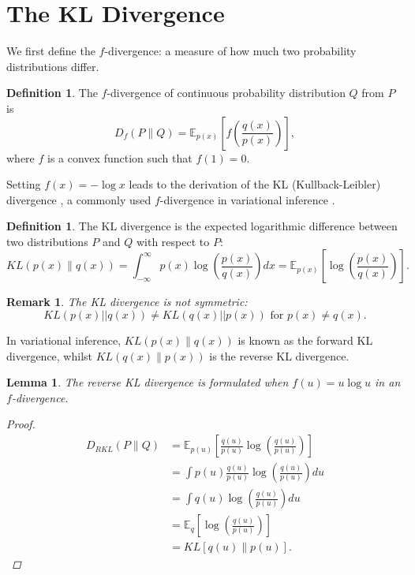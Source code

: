 \documentclass[honours,12pt]{unswthesis}
\newtheorem{lemma}[theorem]{Lemma}
\newtheorem{remark}[theorem]{Remark}
\numberwithin{equation}{section}
\theoremstyle{definition}
\newtheorem{definition}[theorem]{Definition}
\begin{document}
\section{The KL Divergence}\label{sec:3.2}
We first define the $f$-divergence: a measure of how much two probability distributions differ.
\begin{definition}\label{def:3.2.1}
The $f$-divergence of continuous probability distribution $Q$ from $P$ is
\[D_f(P\|Q)=\mathbb{E}_{p(x)}\left[f\left(\frac{q(x)}{p(x)}\right)\right],\]
where $f$ is a convex function such that $f(1)=0$.
\end{definition}
Setting $f(x)=-\log x$ leads to the derivation of the KL (Kullback-Leibler) divergence \citep{KL}, a commonly used $f$-divergence in variational inference \citep{blei}.
\begin{definition}
The KL divergence is the expected logarithmic difference between two distributions $P$ and $Q$ with respect to $P$:
\begin{equation*}
KL(p(x)\|q(x))=\int_{-\infty}^\infty p(x)\log \left(\frac{p(x)}{q(x)}\right)dx=\mathbb{E}_{p(x)}\left[\log\left(\frac{p(x)}{q(x)}\right)\right].
\end{equation*}
\end{definition}
\begin{remark}
The KL divergence is not symmetric:
\begin{equation*}
KL(p(x)||q(x))\neq KL(q(x)||p(x))\text{ for }p(x)\neq q(x).
\end{equation*}
\end{remark}
In variational inference, $KL(p(x)\|q(x))$ is known as the forward KL divergence, whilst $KL(q(x)\|p(x))$ is the reverse KL divergence.
\begin{lemma}
The reverse KL divergence is formulated when $f(u)=u\log u$ in an $f$-divergence.
\begin{proof}
\begin{align*}
D_{RKL}(P\|Q)&=\mathbb{E}_{p(u)}\left[\frac{q(u)}{p(u)}\log \left(\frac{q(u)}{p(u)}\right)\right]\\
&=\int p(u)\frac{q(u)}{p(u)}\log\left(\frac{q(u)}{p(u)}\right)du\\
&= \int q(u)\log\left(\frac{q(u)}{p(u)}\right)du\\
&= \mathbb{E}_q\left[\log \left(\frac{q(u)}{p(u)}\right)\right]\\
&=KL[q(u)\|p(u)].
\end{align*}
\end{proof}
\end{lemma}
\end{document}
